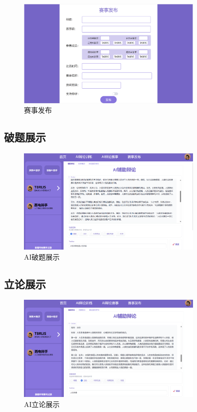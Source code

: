 \documentclass[a4paper,]{article}
\newcommand{\xiaosihao}{\fontsize{12pt}{\baselineskip}\selectfont}
\newcommand{\zw}{\setlength{\baselineskip}{1.5em}\xiaosihao}
\begin{document}
        \begin{figure}[H]
      	\centering
      	\includegraphics[width=0.8\textwidth,height=0.4\textwidth]{AI赛事发布.png}
      	\caption{赛事发布}
      \end{figure} 
      
        
        \subsection{破题展示}
        \zw{破题功能能从十个不同的辩论角度分析一个辩题，让辩手得以充分了解辩题。}
     	  \begin{figure}[H]
     		\centering
     		\includegraphics[width=0.8\textwidth,height=0.4\textwidth]{AI辅助破题.png}
     		\caption{AI破题展示}
     	\end{figure} 
        
        \subsection{立论展示}
         \zw{立论功能基本能输出一篇字数达标且格式符合要求，论证质量过关的辩论稿。}
     
         \begin{figure}[H]
        	\centering
        	\includegraphics[width=0.8\textwidth,height=0.4\textwidth]{AI辅助立论.png}
        	\caption{AI立论展示}
        \end{figure} 
\end{document}

